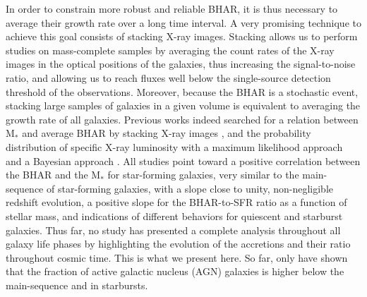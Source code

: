     In order to constrain more robust and reliable BHAR, 
    it is thus necessary to average their growth rate over a long time interval. A very promising technique to achieve this goal consists of stacking X-ray images. 
    Stacking allows us to perform studies on mass-complete samples by averaging the count rates of the X-ray images in the optical positions of the galaxies, thus increasing the signal-to-noise ratio, and allowing us to reach fluxes well below the single-source detection threshold of the observations. Moreover, because the BHAR is a stochastic event, stacking large samples of galaxies in a given volume is equivalent to averaging the growth rate of all galaxies.
    Previous works indeed searched for a relation between M$_*$ and average BHAR by stacking X-ray images \citep[e.g.,][]{2012ApJ...753L..30M, 2015ApJ...800L..10R, 2017ApJ...842...72Y}, and the probability distribution of specific X-ray luminosity with a maximum likelihood approach \citep{2012ApJ...746...90A, 2012MNRAS.427.3103B, 2018MNRAS.475.1887Y} and a Bayesian approach \citep{2018MNRAS.474.1225A}. All studies point toward a positive correlation between the BHAR and the M$_*$ for star-forming galaxies, very similar to the main-sequence of star-forming galaxies, with a slope close to unity, non-negligible redshift evolution, a positive slope for the BHAR-to-SFR ratio as a function of stellar mass, and indications of different behaviors for quiescent and starburst galaxies. 
    Thus far, no study has presented a complete analysis throughout all galaxy life phases by highlighting the evolution of the accretions and their ratio throughout cosmic time. This is what we present here. So far, only \citet{2019MNRAS.484.4360A} have shown that the fraction of active galactic nucleus (AGN) galaxies is higher below the main-sequence and in starbursts.
        
